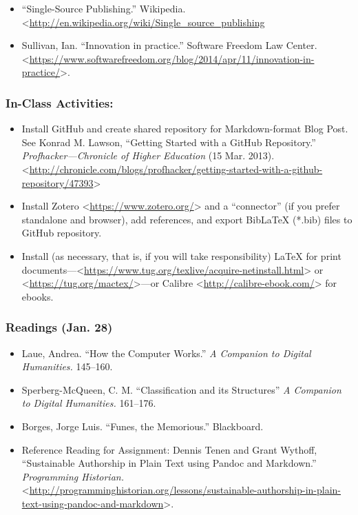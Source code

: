 \documentclass[]{article}
\begin{document}
\begin{itemize}
\itemsep1pt\parskip0pt
\item
  ``Single-Source Publishing.'' Wikipedia.
  \textless{}\url{http://en.wikipedia.org/wiki/Single_source_publishing}
\item
  Sullivan, Ian. ``Innovation in practice.'' Software Freedom Law
  Center.
  \textless{}\url{https://www.softwarefreedom.org/blog/2014/apr/11/innovation-in-practice/}\textgreater{}.
\end{itemize}

\subsubsection{In-Class Activities:}\label{in-class-activities-1}

\begin{itemize}
\itemsep1pt\parskip0pt
\item
  Install GitHub and create shared repository for Markdown-format Blog
  Post. See Konrad M. Lawson, ``Getting Started with a GitHub
  Repository.'' \emph{Profhacker---Chronicle of Higher Education} (15
  Mar. 2013).
  \textless{}\url{http://chronicle.com/blogs/profhacker/getting-started-with-a-github-repository/47393}\textgreater{}
\item
  Install Zotero \textless{}\url{https://www.zotero.org/}\textgreater{}
  and a ``connector'' (if you prefer standalone and browser), add
  references, and export BibLaTeX (*.bib) files to GitHub repository.
\item
  Install (as necessary, that is, if you will take responsibility) LaTeX
  for print
  documents---\textless{}\url{https://www.tug.org/texlive/acquire-netinstall.html}\textgreater{}
  or \textless{}\url{https://tug.org/mactex/}\textgreater{}---or Calibre
  \textless{}\url{http://calibre-ebook.com/}\textgreater{} for ebooks.
\end{itemize}

\subsubsection{Readings (Jan. 28)}\label{readings-jan.-28}

\begin{itemize}
\itemsep1pt\parskip0pt
\item
  Laue, Andrea. ``How the Computer Works.'' \emph{A Companion to Digital
  Humanities.} 145--160.
\item
  Sperberg-McQueen, C. M. ``Classification and its Structures'' \emph{A
  Companion to Digital Humanities.} 161--176.
\item
  Borges, Jorge Luis. ``Funes, the Memorious.'' Blackboard.
\item
  Reference Reading for Assignment: Dennis Tenen and Grant Wythoff,
  ``Sustainable Authorship in Plain Text using Pandoc and Markdown.''
  \emph{Programming Historian.}
  \textless{}\url{http://programminghistorian.org/lessons/sustainable-authorship-in-plain-text-using-pandoc-and-markdown}\textgreater{}.
\end{itemize}
\end{document}
